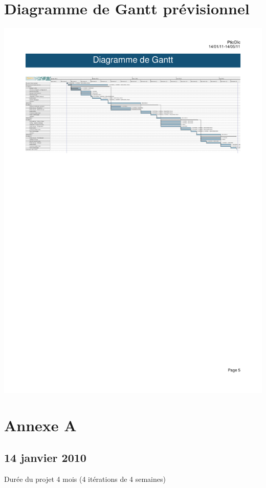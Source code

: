 \documentclass[a4paper,11pt,french]{article}
\begin{document}
\section{Diagramme de Gantt prévisionnel}
\label{sec:gantt-original}
\noindent
\hskip -2.6cm%
\includegraphics[trim=1.7cm 19cm 1.7cm 4cm,clip,width=20cm]{../feuille-route/gp-pticlic.pdf}
\newpage

\section{Annexe A}


\subsection{14 janvier 2010}


Durée du projet 4 mois (4 itérations de 4 semaines)
\end{document}
